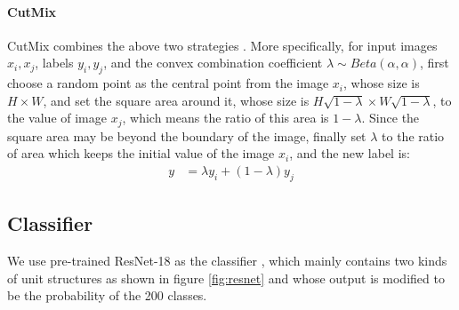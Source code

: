 \documentclass{article}
\begin{document}
\paragraph{CutMix}
CutMix combines the above two strategies \citep{CutMix}. More specifically, for input images $x_i, x_j$, labels $y_i, y_j$, and the convex combination coefficient $\lambda \sim Beta(\alpha, \alpha)$, first choose a random point as the central point from the image $ x_i $, whose size is $ H \times W $, and set the square area around it, whose size is $ H \sqrt{1 - \lambda} \times W \sqrt{1 - \lambda}$, to the value of image $x_j$, which means the ratio of this area is $ 1 - \lambda $. Since the square area may be beyond the boundary of the image, finally set $ \lambda $ to the ratio of area which keeps the initial value of the image $ x_i $, and the new label is:
\begin{align*}
	y &= \lambda y_i + (1 - \lambda) y_j
\end{align*}

\subsection{Classifier}

We use pre-trained ResNet-18 as the classifier \citep{ResNet}, which mainly contains two kinds of unit structures as shown in figure \ref{fig:resnet} and whose output is modified to be the probability of the 200 classes.
\end{document}
